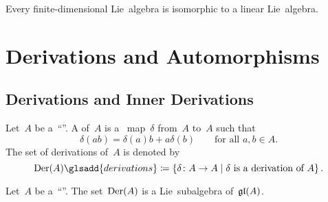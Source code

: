 \begin{theorem}
  Every finite-dimensional Lie~algebra is isomorphic to a linear Lie~algebra.
\end{theorem}





\section{Derivations and Automorphisms}



\subsection{Derivations and Inner Derivations}


\begin{definition}
  \label{definition of derivations}
  Let~$A$ be a~\enquote{\algebra{$\kf$}}.
  A  of~$A$ is a~{\linear{$\kf$}} map~$\delta$ from~$A$ to~$A$ such that
  \[
    \delta(ab)
    =
    \delta(a) b + a \delta(b)
    \qquad
    \text{for all~$a, b \in A$.}
  \]
  The set of derivations of~$A$ is denoted by
  \[
    \Der(A)\glsadd{derivations}
    \defined
    \{
      \delta
      \colon
      A
      \textstyle\to
      A
    \suchthat
      \text{$\delta$ is a derivation of~$A$}
    \}  \,.
  \]
\end{definition}


\begin{proposition}
  Let~$A$ be a~\enquote{\algebra{$\kf$}}.
  The set~$\operatorname{Der}(A)$ is a Lie~subalgebra of~$\mathfrak{gl}(A)$.
\end{proposition}


